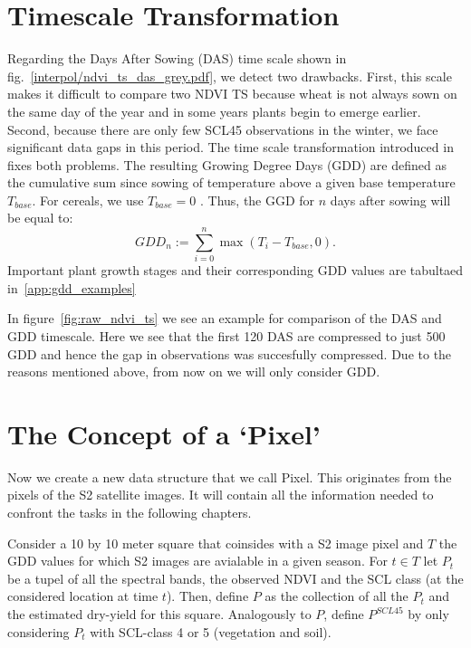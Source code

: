 \section{Timescale Transformation}\label{sec:gdd_def}
	{%
		Regarding the Days After Sowing (DAS) time scale shown in fig.~\ref{interpol/ndvi_ts_das_grey.pdf}, we detect two drawbacks. First, this scale makes it difficult to compare two NDVI {TS} because wheat is not always sown on the same day of the year and in some years plants begin to emerge earlier. Second, because there are only few SCL45 observations in the winter, we face significant data gaps in this period. The time scale transformation introduced in \cite{mcmasterGrowingDegreedaysOne1997} fixes both problems. The resulting Growing Degree Days ({GDD}) are defined as the cumulative sum since sowing of temperature above a given base temperature $T_{base}$. For cereals, we use $T_{base}=0$ \citep{perichPixelbasedCropYield2022}. Thus, the GGD for $n$ days after sowing will be equal to:
		\begin{equation}
			\label{eq:gdd}
			GDD_n := \sum_{i=0}^n \max(T_i - T_{base}, 0).
		\end{equation}
		Important plant growth stages and their corresponding GDD values are tabultaed in~\ref{app:gdd_examples}

		In figure~\ref{fig:raw_ndvi_ts} we see an example for comparison of the DAS and GDD timescale. Here we see that the first 120 DAS are compressed to just 500 GDD and hence the gap in observations was succesfully compressed. Due to the reasons mentioned above, from now on we will only consider GDD.
	} 

\section{The Concept of a `Pixel'}{ \label{sec:gather_data_to_pixel}
	Now we create a new data structure that we call Pixel. This originates from the pixels of the S2 satellite images. It will contain all the information needed to confront the tasks in the following chapters. 
		
		Consider a 10 by 10 meter square that coinsides with a S2 image pixel and $T$ the GDD values for which S2 images are avialable in a given season. For $t\in T$ let $P_t$ be a tupel of all the spectral bands, the observed NDVI and the SCL class (at the considered location at time $t$). Then, define $P$ as the collection of all the $P_t$ and the estimated dry-yield for this square.
		Analogously to $P$, define $P^{SCL45}$ by only considering $P_t$ with SCL-class 4 or 5 (vegetation and soil).  
}

